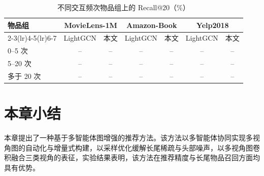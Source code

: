 \begin{table}[htbp]
  \centering
  \caption{不同交互频次物品组上的 Recall@20（\%）}
  \label{tab:graph-coldstart}
  \begin{tabular}{lcccccc}
    \toprule
    \multirow{2}{*}{物品组} & \multicolumn{2}{c}{MovieLens-1M} & \multicolumn{2}{c}{Amazon-Book} & \multicolumn{2}{c}{Yelp2018} \\
    \cmidrule(lr){2-3}\cmidrule(lr){4-5}\cmidrule(lr){6-7}
     & LightGCN & 本文 & LightGCN & 本文 & LightGCN & 本文 \\
    \midrule
    0--5 次    & -- & -- & -- & -- & -- & -- \\
    5--20 次   & -- & -- & -- & -- & -- & -- \\
    多于 20 次 & -- & -- & -- & -- & -- & -- \\
    \bottomrule
  \end{tabular}
\end{table}


\section{本章小结}
\label{sec:graph-summary}

本章提出了一种基于多智能体图增强的推荐方法。该方法以多智能体协同实现多视角图的自动化与增量式构建，以采样优化缓解长尾稀疏与头部噪声，以多视角图卷积融合三类视角的表征，实验结果表明，该方法在推荐精度与长尾物品召回方面均具有优势。
